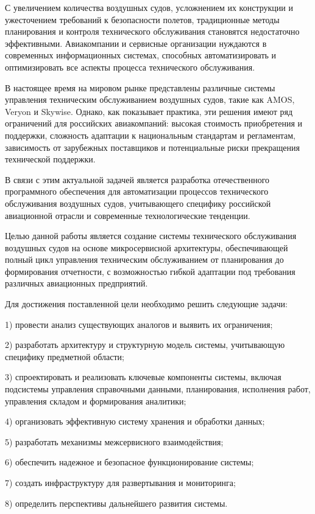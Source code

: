 \documentclass[14pt,a4paper]{extarticle}
\begin{document}
С увеличением количества воздушных судов, усложнением их конструкции и ужесточением требований к безопасности полетов, традиционные методы планирования и контроля технического обслуживания становятся недостаточно эффективными. Авиакомпании и сервисные организации нуждаются в современных информационных системах, способных автоматизировать и оптимизировать все аспекты процесса технического обслуживания.

В настоящее время на мировом рынке представлены различные системы управления техническим обслуживанием воздушных судов, такие как AMOS, Veryon и Skywise. Однако, как показывает практика, эти решения имеют ряд ограничений для российских авиакомпаний: высокая стоимость приобретения и поддержки, сложность адаптации к национальным стандартам и регламентам, зависимость от зарубежных поставщиков и потенциальные риски прекращения технической поддержки.

В связи с этим актуальной задачей является разработка отечественного программного обеспечения для автоматизации процессов технического обслуживания воздушных судов, учитывающего специфику российской авиационной отрасли и современные технологические тенденции.

Целью данной работы является создание системы технического обслуживания воздушных судов на основе микросервисной архитектуры, обеспечивающей полный цикл управления техническим обслуживанием от планирования до формирования отчетности, с возможностью гибкой адаптации под требования различных авиационных предприятий.

Для достижения поставленной цели необходимо решить следующие задачи:

1) провести анализ существующих аналогов и выявить их ограничения;

2) разработать архитектуру и структурную модель системы, учитывающую специфику предметной области;

3) спроектировать и реализовать ключевые компоненты системы, включая подсистемы управления справочными данными, планирования, исполнения работ, управления складом и формирования аналитики;

4) организовать эффективную систему хранения и обработки данных;

5) разработать механизмы межсервисного взаимодействия;

6) обеспечить надежное и безопасное функционирование системы;

7) создать инфраструктуру для развертывания и мониторинга;

8) определить перспективы дальнейшего развития системы.
\end{document}
